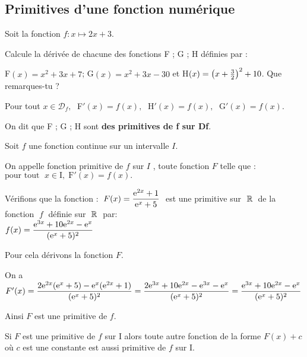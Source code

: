 


  

\subsection{Primitives d'une fonction numérique}
\begin{lemma}
Soit la fonction $ f : x \longmapsto 2x+3 $.

Calcule la dérivée de chacune des fonctions F ; G ; H définies par :

F$ (x)=x^{2} +3x+7$;  G$ (x)= x^{2} +3x-30$  et  H$ (x)=\left(x+\frac{3}{2}\right)^{2} +10$. Que remarques-tu ?
\medskip

Pour tout $ x\in \mathscr{D}_f,\; $  F$' (x)=f(x),\;$  H$' (x)=f(x),\;$  G$' (x)=f(x)$.
\end{lemma}

\medskip
On dit que F ; G ; H sont  \textbf{des primitives de f sur Df}.

\begin{definition}
Soit $ f $ une fonction continue sur un intervalle $I$.

 On appelle fonction primitive de $f$ sur $I$ , toute fonction $F$ telle que :\\
$ \text{pour tout } \; x\in \text{I},\;  \text{F}'(x) = f (x).$
\end{definition}

\medskip


\begin{example}

Vérifions que la fonction : $\; F(x)=\dfrac{\mathrm{e}^{2x}+1}{\mathrm{e}^{x}+5}\; $  est une primitive sur $ \;\mathbb{R}\;  $ de la fonction $\; f\; $  définie sur $\; \mathbb{R}\; $  par: \\

 $  f(x)= \dfrac{\mathrm{e}^{3x}+10\mathrm{e}^{2x}-\mathrm{e}^{x}}{(\mathrm{e}^{x}+5)^{2}}$

\bigskip
Pour cela dérivons la fonction $F$.

\medskip
On a  $F'(x)=\dfrac{2\mathrm{e}^{2x}(\mathrm{e}^{x}+5)-\mathrm{e}^{x}(\mathrm{e}^{2x}+1)}{(\mathrm{e}^{x}+5)^{2}}  =\dfrac{2\mathrm{e}^{3x}+10\mathrm{e}^{2x}-\mathrm{e}^{3x}-\mathrm{e}^{x}}{(\mathrm{e}^{x}+5)^{2}}=\dfrac{\mathrm{e}^{3x}+10\mathrm{e}^{2x}-\mathrm{e}^{x}}{(\mathrm{e}^{x}+5)^{2}}$

Ainsi $F$ est une primitive de $ f. $
\end{example}



\begin{property}
 Si $F$ est une primitive de $ f $ sur I alors  toute  autre  fonction   de la  forme $ F(x)+c $ où $ c $ est une constante   est aussi primitive  de $ f $ sur I.
\end{property}

